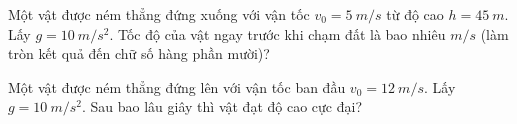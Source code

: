 \begin{ex}
Một vật được ném thẳng đứng xuống với vận tốc $v_0 = 5\ m/s$ từ độ cao $h = 45\ m$. Lấy $g = 10\ m/s^2$. Tốc độ của vật ngay trước khi chạm đất là bao nhiêu $m/s$ (làm tròn kết quả đến chữ số hàng phần mười)?
\end{ex}

\begin{ex}
Một vật được ném thẳng đứng lên với vận tốc ban đầu $v_0 = 12\ m/s$. Lấy $g = 10\ m/s^2$. Sau bao lâu giây thì vật đạt độ cao cực đại?
\end{ex}
\newpage 